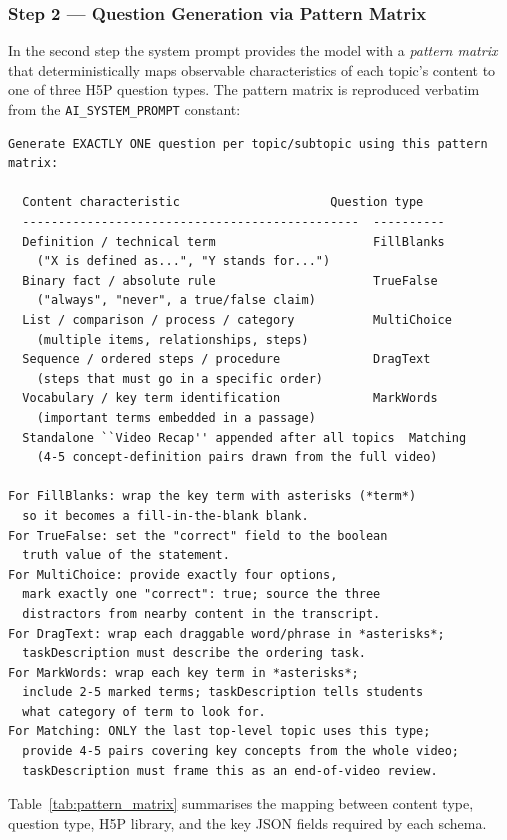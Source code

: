 \subsubsection{Step 2 --- Question Generation via Pattern Matrix}

In the second step the system prompt provides the model with a
\emph{pattern matrix} that deterministically maps observable
characteristics of each topic's content to one of three H5P question
types. The pattern matrix is reproduced verbatim from the
\texttt{AI\_SYSTEM\_PROMPT} constant:

\begin{lstlisting}[language={},caption={Pattern matrix from the AI system prompt (Step 2)}]
Generate EXACTLY ONE question per topic/subtopic using this pattern matrix:

  Content characteristic                     Question type
  -----------------------------------------------  ----------
  Definition / technical term                      FillBlanks
    ("X is defined as...", "Y stands for...")
  Binary fact / absolute rule                      TrueFalse
    ("always", "never", a true/false claim)
  List / comparison / process / category           MultiChoice
    (multiple items, relationships, steps)
  Sequence / ordered steps / procedure             DragText
    (steps that must go in a specific order)
  Vocabulary / key term identification             MarkWords
    (important terms embedded in a passage)
  Standalone ``Video Recap'' appended after all topics  Matching
    (4-5 concept-definition pairs drawn from the full video)

For FillBlanks: wrap the key term with asterisks (*term*)
  so it becomes a fill-in-the-blank blank.
For TrueFalse: set the "correct" field to the boolean
  truth value of the statement.
For MultiChoice: provide exactly four options,
  mark exactly one "correct": true; source the three
  distractors from nearby content in the transcript.
For DragText: wrap each draggable word/phrase in *asterisks*;
  taskDescription must describe the ordering task.
For MarkWords: wrap each key term in *asterisks*;
  include 2-5 marked terms; taskDescription tells students
  what category of term to look for.
For Matching: ONLY the last top-level topic uses this type;
  provide 4-5 pairs covering key concepts from the whole video;
  taskDescription must frame this as an end-of-video review.
\end{lstlisting}

Table~\ref{tab:pattern_matrix} summarises the mapping between content
type, question type, H5P library, and the key JSON fields required by
each schema.

